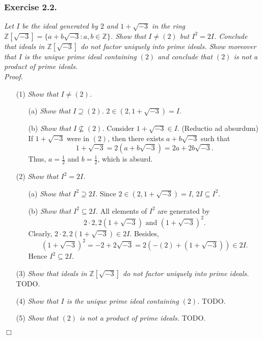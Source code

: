 \documentclass{article}
\begin{document}



\subsubsection*{Exercise 2.2.}
\emph{Let $I$ be the ideal generated by $2$ and $1 + \sqrt{-3}$ in the ring
$\mathbb{Z}[\sqrt{-3}] = \{ a+b\sqrt{-3} : a,b \in \mathbb{Z} \}$.
Show that $I \neq (2)$ but $I^2 = 2I$.
Conclude that ideals in $\mathbb{Z}[\sqrt{-3}]$ do not factor uniquely
into prime ideals.
Show moreover that $I$ is the unique prime ideal containing $(2)$
and conclude that $(2)$ is not a product of prime ideals.} \\

\emph{Proof.}
\begin{enumerate}
\item[(1)]
\emph{Show that $I \neq (2)$.}
  \begin{enumerate}
  \item[(a)]
  \emph{Show that $I \supseteq (2)$.}
  $2 \in (2,1+\sqrt{-3}) = I$.
  \item[(b)]
  \emph{Show that $I \not\subseteq (2)$.}
  Consider $1+\sqrt{-3} \in I$.
  (Reductio ad absurdum)
  If $1+\sqrt{-3}$ were in $(2)$, then there exists $a+b\sqrt{-3}$ such that
    $$1+\sqrt{-3} = 2(a+b\sqrt{-3}) = 2a+2b\sqrt{-3}.$$
  Thus, $a = \frac{1}{2}$ and $b = \frac{1}{2}$, which is absurd.
  \end{enumerate}
\item[(2)]
\emph{Show that $I^2 = 2I$.}
  \begin{enumerate}
  \item[(a)]
  \emph{Show that $I^2 \supseteq 2I$.}
  Since $2 \in (2,1+\sqrt{-3}) = I$, $2I \subseteq I^2$.
  \item[(b)]
  \emph{Show that $I^2 \subseteq 2I$.}
  All elements of $I^2$ are generated by
  $$2 \cdot 2, 2(1+\sqrt{-3}) \text{ and } (1+\sqrt{-3})^2.$$
  Clearly, $2 \cdot 2, 2(1+\sqrt{-3}) \in 2I$.
  Besides,
  $$(1+\sqrt{-3})^2 = -2 + 2\sqrt{-3} = 2(-(2) + (1+\sqrt{-3})) \in 2I.$$
  Hence $I^2 \subseteq 2I$.
  \end{enumerate}
\item[(3)]
\emph{Show that ideals in $\mathbb{Z}[\sqrt{-3}]$ do not factor uniquely
into prime ideals.}
TODO.
\item[(4)]
\emph{Show that $I$ is the unique prime ideal containing $(2)$.}
TODO.
\item[(5)]
\emph{Show that $(2)$ is not a product of prime ideals.}
TODO.
\end{enumerate}
$\Box$ \\\\
\end{document}
